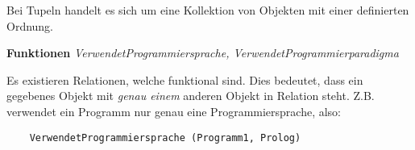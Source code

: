 Bei Tupeln handelt es sich um eine Kollektion von Objekten mit einer definierten Ordnung.


\textbf{Funktionen} \textit{VerwendetProgrammiersprache, VerwendetProgrammierparadigma}

Es existieren Relationen, welche funktional sind. Dies bedeutet, dass ein gegebenes Objekt mit \textit{genau einem} anderen Objekt in Relation steht. Z.B. verwendet ein Programm nur genau eine Programmiersprache, also:

\lstset{language=Prolog}
\begin{lstlisting}
    VerwendetProgrammiersprache (Programm1, Prolog)
\end{lstlisting}



